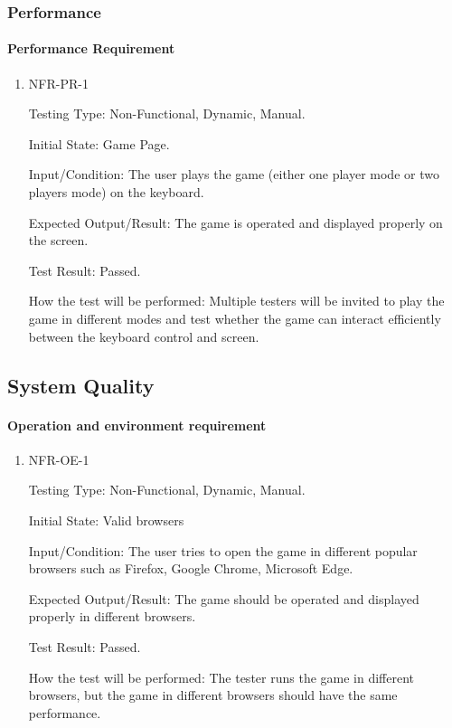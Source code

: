 \documentclass[12pt, titlepage]{article}
\begin{document}
\subsubsection{Performance}
\paragraph{Performance Requirement}

\begin{enumerate}

\item{NFR-PR-1\\}

Testing Type: Non-Functional, Dynamic, Manual.  

Initial State: Game Page.

Input/Condition: The user plays the game (either one player mode or two players mode) on the keyboard.

Expected Output/Result: The game is operated and displayed properly on the screen.

Test Result: Passed.

How the test will be performed: Multiple testers will be invited to play the game in different modes and test whether the game can interact efficiently between the keyboard control and screen.
\\
\end{enumerate}




\subsection{System Quality}
\paragraph{Operation and environment requirement}

\begin{enumerate}

\item{NFR-OE-1\\}

Testing Type: Non-Functional, Dynamic, Manual. 
 
Initial State: Valid browsers

Input/Condition: The user tries to open the game in different popular browsers such as Firefox, Google Chrome, Microsoft Edge.

Expected Output/Result: The game should be operated and displayed properly in different browsers.

Test Result: Passed.

How the test will be performed: The tester runs the game in different browsers, but the game in different browsers should have the same performance.

 

\end{enumerate}
\end{document}
